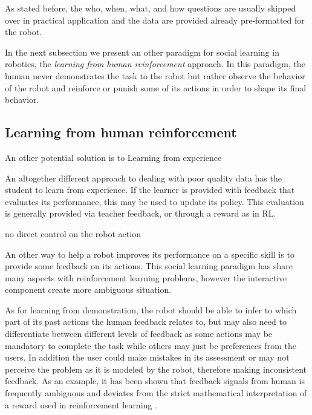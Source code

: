 \transition

As stated before, the who, when, what, and how questions are usually skipped over in practical application and the data are provided already pre-formatted for the robot.

In the next subsection we present an other paradigm for social learning in robotics, the \emph{learning from human reinforcement} approach. In this paradigm, the human never demonstrates the task to the robot but rather observe the behavior of the robot and reinforce or punish some of its actions in order to shape its final behavior.

\subsection{Learning from human reinforcement}


An other potential solution is to  Learning from experience

An altogether different approach to dealing with poor quality data has the student to learn from experience. If the learner is provided with feedback that evaluates its performance, this may be used to update its policy. This evaluation is generally provided via teacher feedback, or through a reward as in RL.



no direct control on the robot action


An other way to help a robot improves its performance on a specific skill is to provide some feedback on its actions. This social learning paradigm has share many aspects with reinforcement learning problems, however the interactive component create more ambiguous situation. 

As for learning from demonstration, the robot should be able to infer to which part of its past actions the human feedback relates to, but may also need to differentiate between different levels of feedback as some actions may be mandatory to complete the task while others may just be preferences from the users. In addition the user could make mistakes in its assessment or may not perceive the problem as it is modeled by the robot, therefore making inconsistent feedback. As an example, it has been shown that feedback signals from human is frequently ambiguous and deviates from the strict mathematical interpretation of a reward used in reinforcement learning \cite{thomaz2008teachable,Cakmak2010optimality}.

